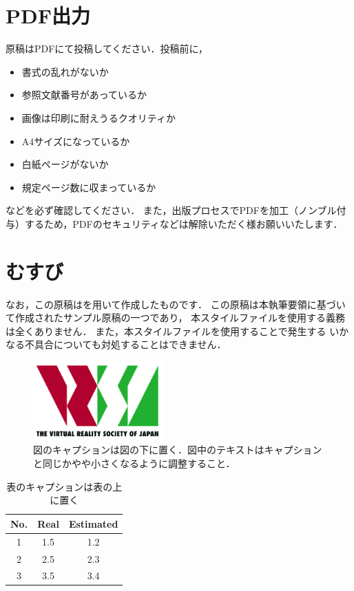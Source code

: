 \documentclass[a4paper]{jarticle}
\begin{document}
\section{PDF出力}
原稿はPDFにて投稿してください．投稿前に，
\begin{itemize}
 \item 書式の乱れがないか
 \item 参照文献番号があっているか
 \item 画像は印刷に耐えうるクオリティか
 \item A4サイズになっているか
 \item 白紙ページがないか
 \item 規定ページ数に収まっているか
\end{itemize}
などを必ず確認してください．
また，出版プロセスでPDFを加工（ノンブル付与）するため，PDFのセキュリティなどは解除いただく様お願いいたします．

\balance

\section{むすび}
なお，この原稿は\LaTeXe を用いて作成したものです．
この原稿は本執筆要領に基づいて作成されたサンプル原稿の一つであり，
本スタイルファイルを使用する義務は全くありません．
また，本スタイルファイルを使用することで発生する
いかなる不具合についても対処することはできません．
\\

\begin{figure}[tb]
  \begin{center}
    \includegraphics*[width=50mm]{logo.png}
  \end{center}
  \vspace*{-6mm}
  \caption{図のキャプションは図の下に置く．図中のテキストはキャプションと同じかやや小さくなるように調整すること．}
  \label{figure}
\end{figure}

\begin{table}[tb]
\caption{表のキャプションは表の上に置く}
\label{table}
\begin{center}\small
\def\arraystretch{1.2}
\begin{tabular}{|c||c|c|}\hline 
No. & Real & Estimated \\ \hline \hline
1   & 1.5  & 1.2       \\ \hline
2   & 2.5  & 2.3       \\ \hline
3   & 3.5  & 3.4       \\ \hline
\end{tabular}
\end{center}
\vspace*{-3mm}
\end{table}
\end{document}
